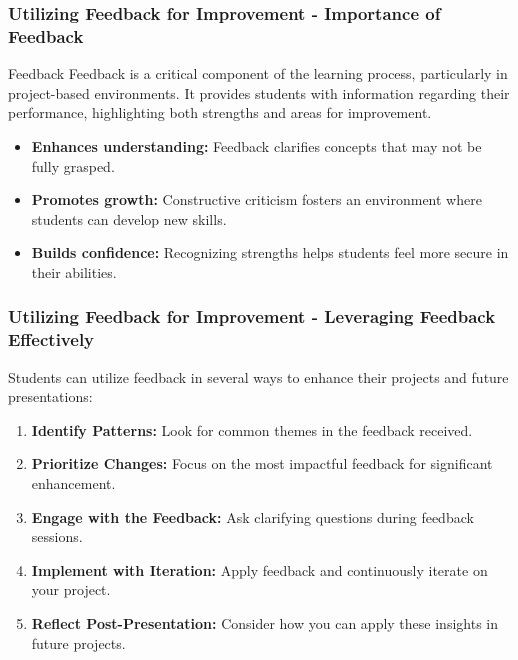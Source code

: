 \documentclass[aspectratio=169]{beamer}
\begin{document}
\begin{frame}[fragile]
    \frametitle{Utilizing Feedback for Improvement - Importance of Feedback}
    \begin{block}{Feedback}
        Feedback is a critical component of the learning process, particularly in project-based environments. It provides students with information regarding their performance, highlighting both strengths and areas for improvement.
    \end{block}
    
    \begin{itemize}
        \item \textbf{Enhances understanding:} Feedback clarifies concepts that may not be fully grasped.
        \item \textbf{Promotes growth:} Constructive criticism fosters an environment where students can develop new skills.
        \item \textbf{Builds confidence:} Recognizing strengths helps students feel more secure in their abilities.
    \end{itemize}
\end{frame}

\begin{frame}[fragile]
    \frametitle{Utilizing Feedback for Improvement - Leveraging Feedback Effectively}
    Students can utilize feedback in several ways to enhance their projects and future presentations:
    
    \begin{enumerate}
        \item \textbf{Identify Patterns:} Look for common themes in the feedback received.
        \item \textbf{Prioritize Changes:} Focus on the most impactful feedback for significant enhancement.
        \item \textbf{Engage with the Feedback:} Ask clarifying questions during feedback sessions.
        \item \textbf{Implement with Iteration:} Apply feedback and continuously iterate on your project.
        \item \textbf{Reflect Post-Presentation:} Consider how you can apply these insights in future projects.
    \end{enumerate}
\end{frame}
\end{document}
